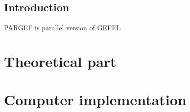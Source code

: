 \documentclass[12pt]{book}
\begin{document}
\tableofcontents

\chapter{Introduction}
PARGEF is parallel version of GEFEL



\part{Theoretical part}





\part{Computer implementation}

\printindex
\end{document}
